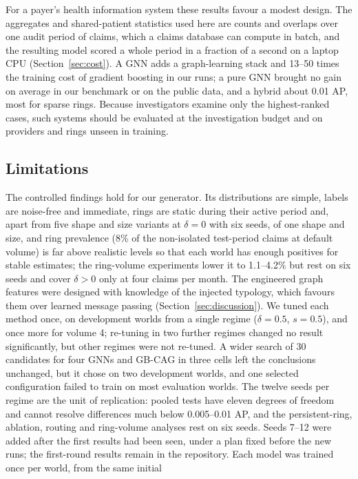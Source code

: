 \documentclass[pdflatex,sn-vancouver-num]{sn-jnl}
\begin{document}
For a payer's health information system these results favour a modest
design. The aggregates and shared-patient statistics used here are counts
and overlaps over one audit period of claims, which a claims database can
compute in batch, and the resulting model scored a whole period in a fraction
of a second on a laptop CPU (Section~\ref{sec:cost}). A GNN adds a
graph-learning stack and 13--50 times the training cost of gradient boosting
in our runs; a pure GNN brought no gain on average in our benchmark or on
the public data, and a hybrid about 0.01 AP, most for sparse rings. Because investigators examine
only the highest-ranked cases, such systems should be evaluated at the
investigation budget and on providers and rings unseen in training.

\subsection{Limitations}\label{sec:limitations}
The controlled findings hold for our generator. Its distributions are
simple, labels are noise-free and immediate, rings are static during their
active period and, apart from five shape and size variants at $\delta=0$
with six seeds, of one shape and size, and ring prevalence (8\% of the
non-isolated test-period claims at default volume) is far above realistic
levels so that each world has enough positives for stable estimates; the
ring-volume experiments lower it to 1.1--4.2\% but rest on six seeds and
cover $\delta>0$ only at four claims per month. The engineered graph features were designed with knowledge of the
injected typology, which favours them over learned message passing
(Section~\ref{sec:discussion}). We tuned each method once, on development
worlds from a single regime ($\delta=0.5$, $s=0.5$), and once more for
volume 4; re-tuning in two further regimes changed no result significantly,
but other regimes were not re-tuned. A wider search of 30 candidates for four
GNNs and GB-CAG in three cells left the conclusions unchanged, but it chose on
two development worlds, and one selected configuration failed to train on most
evaluation worlds. The twelve seeds
per regime are the unit of replication: pooled tests have eleven degrees of
freedom and cannot resolve differences much below 0.005--0.01 AP, and the
persistent-ring, ablation, routing and ring-volume analyses rest on six
seeds. Seeds 7--12 were added after the first results had been seen, under a
plan fixed before the new runs; the first-round results remain in the
repository. Each model was trained once per world, from the same initial
\end{document}
